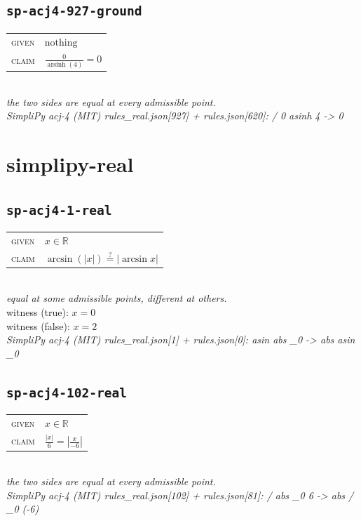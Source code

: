\documentclass[11pt]{article}
\begin{document}
\subsection*{\texttt{sp-acj4-927-ground}}
\begin{tabular}{@{}l@{\quad}l@{}}
\textsc{given} & $\text{nothing}$ \\[4pt]
\textsc{claim} & $\displaystyle \frac{0}{\operatorname{arsinh}\left(4\right)} = 0$ \\
\end{tabular}\\[2pt]
{\small\emph{the two sides are equal at every admissible point.}}\\
\emph{SimpliPy acj-4 (MIT) rules\_real.json[927] + rules.json[620]: / 0 asinh 4  ->  0}\\

\section*{simplipy-real}
\subsection*{\texttt{sp-acj4-1-real}}
\begin{tabular}{@{}l@{\quad}l@{}}
\textsc{given} & $x \in \mathbb{R}$ \\[4pt]
\textsc{claim} & $\displaystyle \arcsin\left(\left|x\right|\right) \overset{?}{=} \left|\arcsin x\right|$ \\
\end{tabular}\\[2pt]
{\small\emph{equal at some admissible points, different at others.}}\\
{\footnotesize\color{gray}witness (true): $x = 0$}\\
{\footnotesize\color{gray}witness (false): $x = 2$}\\
\emph{SimpliPy acj-4 (MIT) rules\_real.json[1] + rules.json[0]: asin abs \_0  ->  abs asin \_0}\\

\subsection*{\texttt{sp-acj4-102-real}}
\begin{tabular}{@{}l@{\quad}l@{}}
\textsc{given} & $x \in \mathbb{R}$ \\[4pt]
\textsc{claim} & $\displaystyle \frac{\left|x\right|}{6} = \left|\frac{x}{-6}\right|$ \\
\end{tabular}\\[2pt]
{\small\emph{the two sides are equal at every admissible point.}}\\
\emph{SimpliPy acj-4 (MIT) rules\_real.json[102] + rules.json[81]: / abs \_0 6  ->  abs / \_0 (-6)}\\
\end{document}
